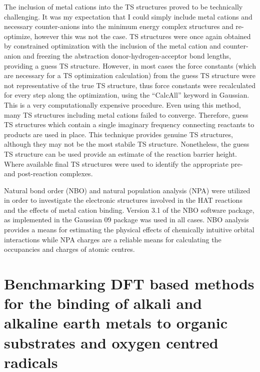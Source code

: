 The inclusion of metal cations into the TS structures proved to be technically challenging. It was my expectation that I could simply include metal cations and necessary counter-anions into the minimum energy complex structures and re-optimize, however this was not the case. TS structures were once again obtained by constrained optimization with the inclusion of the metal cation and counter-anion and freezing the abstraction donor-hydrogen-acceptor bond lengths, providing a guess TS structure. However, in most cases the force constants (which are necessary for a TS optimization calculation) from the guess TS structure were not representative of the true TS structure, thus force constants were recalculated for every step along the optimization, using the ``CalcAll'' keyword in Gaussian. This is a very computationally expensive procedure. Even using this method, many TS structures including metal cations failed to converge. Therefore, guess TS structures which contain a single imaginary frequency connecting reactants to products are used in place. This technique provides genuine TS structures, although they may not be the most stabile TS structure. Nonetheless, the guess TS structure can be used provide an estimate of the reaction barrier height. Where available final TS structures were used to identify the appropriate pre- and post-reaction complexes.

Natural bond order (NBO) and natural population analysis (NPA) were utilized in order to investigate the electronic structures involved in the HAT reactions and the effects of metal cation binding.\cite{Reed1983, Reed1985, Glendening2012} Version 3.1 of the NBO software package,\cite{NBO3} as implemented in the Gaussian 09 package was used in all cases.\cite{Frisch2009} NBO analysis provides a means for estimating the physical effects of chemically intuitive orbital interactions while NPA charges are a reliable means for calculating the occupancies and charges of atomic centres.\cite{Landis2014, Weinhold2016}

\section{Benchmarking DFT based methods for the binding of alkali and alkaline earth metals to organic substrates and oxygen centred radicals}
\label{sec:benchmark}

